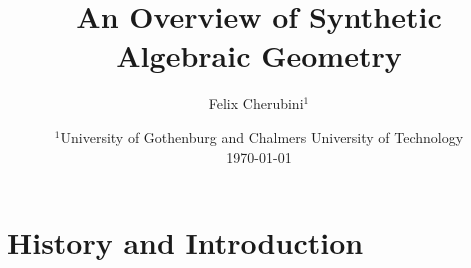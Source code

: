 \documentclass{../util/zariski}
\title{An Overview of Synthetic Algebraic Geometry}
\begin{document}
\author{Felix Cherubini$^1$}
\date{
  $^1$University of Gothenburg and Chalmers University of Technology \\[2ex]%
  \today
}

\maketitle



\section*{History and Introduction}


\printbibliography
\end{document}
